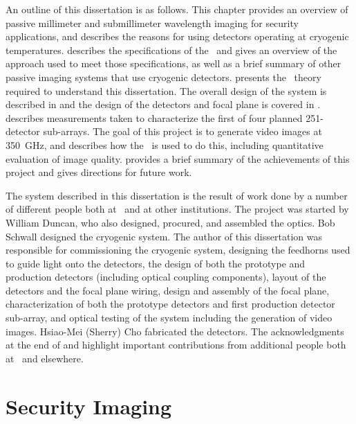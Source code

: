 An outline of this dissertation is as follows.
This chapter provides an overview of passive millimeter and submillimeter wavelength imaging for security applications, and describes the reasons for using detectors operating at cryogenic temperatures.
 describes the specifications of the \Imager\ and gives an overview of the approach used to meet those specifications, as well as a brief summary of other passive imaging systems that use cryogenic detectors.
 presents the \TES\ theory required to understand this dissertation.
The overall design of the system is described in  and the design of the detectors and focal plane is covered in .
 describes measurements taken to characterize the first of four planned 251-detector sub-arrays.
The goal of this project is to generate video images at \SI{350}{\GHz}, and  describes how the \Imager\ is used to do this, including quantitative evaluation of image quality.
 provides a brief summary of the achievements of this project and gives directions for future work.

The system described in this dissertation is the result of work done by a number of different people both at \NIST\ and at other institutions.
The project was started by William Duncan, who also designed, procured, and assembled the optics.
Bob Schwall designed the cryogenic system.
The author of this dissertation was responsible for commissioning the cryogenic system, designing the feedhorns used to guide light onto the detectors, the design of both the prototype and production detectors (including optical coupling components), layout of the detectors and the focal plane wiring, design and assembly of the focal plane, characterization of both the prototype detectors and first production detector sub-array, and optical testing of the system including the generation of video images.
Hsiao-Mei (Sherry) Cho fabricated the detectors.
The acknowledgments at the end of  and  highlight important contributions from additional people both at \NIST\ and elsewhere.

\section{Security Imaging}

